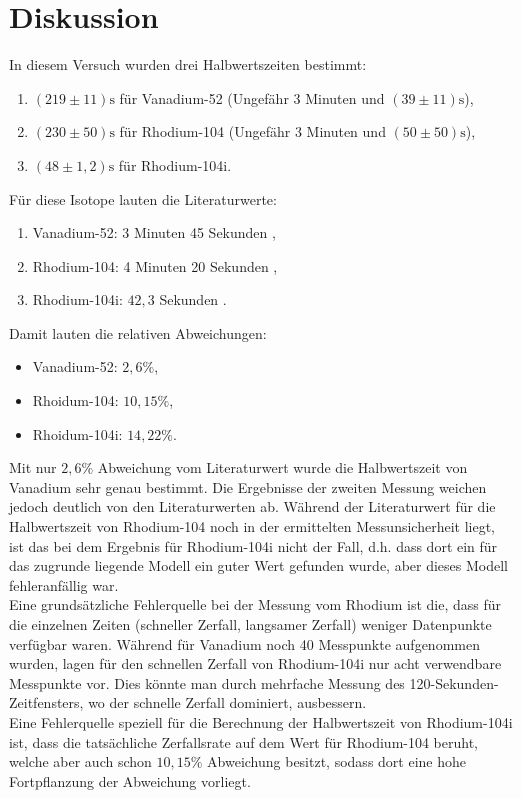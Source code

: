 \section{Diskussion}
\label{sec:Diskussion}

In diesem Versuch wurden drei Halbwertszeiten bestimmt:
\begin{enumerate}
	\item $(219 \pm 11) \si{\second}$ für Vanadium-52 (Ungefähr 3 Minuten und $(39 \pm 11)\si{\second}$),
	\item $(230 \pm 50) \si{\second}$ für Rhodium-104 (Ungefähr 3 Minuten und $(50 \pm 50)\si{\second}$),
	\item $(48 \pm 1,2) \si{\second}$ für Rhodium-104i.
\end{enumerate}
\noindent
Für diese Isotope lauten die Literaturwerte:
\begin{enumerate}
	\item Vanadium-52: 3 Minuten 45 Sekunden \cite{chemie-vanadium},
	\item Rhodium-104: 4 Minuten 20 Sekunden \cite{internetchemie-rhodium},
	\item Rhodium-104i: $42,3$ Sekunden \cite{internetchemie-rhodium}.
\end{enumerate}
Damit lauten die relativen Abweichungen:
\begin{itemize}
	\item Vanadium-52: $2,6\%$,
	\item Rhoidum-104: $10,15\%$,
	\item Rhoidum-104i: $14,22\%$.
\end{itemize}

\noindent
Mit nur $2,6\%$ Abweichung vom Literaturwert wurde die Halbwertszeit von Vanadium sehr genau bestimmt. Die 
Ergebnisse der zweiten Messung weichen jedoch deutlich von den Literaturwerten ab. 
Während der Literaturwert für die Halbwertszeit
von Rhodium-104 noch in der ermittelten Messunsicherheit liegt, ist das bei dem Ergebnis für Rhodium-104i nicht
der Fall, d.h. dass dort ein für das zugrunde liegende Modell ein guter Wert gefunden wurde, aber dieses Modell
fehleranfällig war.
\\
Eine grundsätzliche Fehlerquelle bei der Messung vom Rhodium ist die, dass für die einzelnen Zeiten (schneller
Zerfall, langsamer Zerfall) weniger Datenpunkte verfügbar waren. Während für Vanadium noch 40 Messpunkte
aufgenommen wurden, lagen für den schnellen Zerfall von Rhodium-104i nur acht verwendbare Messpunkte vor.
Dies könnte man durch mehrfache Messung des 120-Sekunden-Zeitfensters, wo der schnelle Zerfall dominiert, 
ausbessern.
\\
Eine Fehlerquelle speziell für die Berechnung der Halbwertszeit von Rhodium-104i ist, 
dass die tatsächliche Zerfallsrate
auf dem Wert für Rhodium-104 beruht, welche aber auch schon $10,15\%$ Abweichung besitzt, sodass dort 
eine hohe Fortpflanzung der Abweichung vorliegt.
